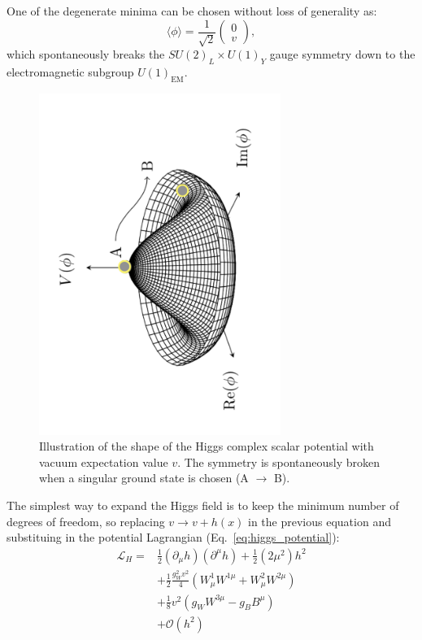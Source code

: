 One of the degenerate minima can be chosen without loss of generality as:
\begin{equation}
\langle \phi \rangle = \frac{1}{\sqrt{2}} \begin{pmatrix}
0 \\
v
\end{pmatrix},
\end{equation}
which spontaneously breaks the $SU(2)_L \times U(1)_Y$ gauge symmetry down to the electromagnetic subgroup $U(1)_{\text{EM}}$.

\begin{figure}[htbp]
  \centering
  \includegraphics[angle=-90,width=0.7\textwidth]{images/mexican_hat.pdf}
  \caption{Illustration of the shape of the Higgs complex scalar potential with vacuum expectation value $v$. The symmetry is spontaneously broken when a singular ground state is chosen (A $\rightarrow$ B).}
  \label{fig:mexican_hat}
\end{figure}

The simplest way to expand the Higgs field is to keep the minimum number of degrees of freedom, so replacing $v\rightarrow v+h(x)$ in the previous equation and substituing in the potential Lagrangian (Eq.~\ref{eq:higgs_potential}): 
\begin{equation}
\begin{split}
\mathcal{L}_{H} = 
&\frac{1}{2}(\partial_{\mu}h)(\partial^{\mu}h) + \frac{1}{2}(2\mu^2)h^2\\  
& + \frac{1}{2}\frac{g^2_{W}v^2}{4}(W_{\mu}^1W^{1\mu}+W_{\mu}^2W^{2\mu})\\
& +\frac{1}{8}v^2(g_{W}W^{3\mu}-g_{B}B^{\mu})\\ 
& + \mathcal{O}(h^2)
\end{split} 
\label{eq:ew_broken}
\end{equation}


